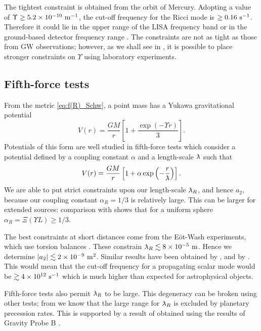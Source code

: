 The tightest constraint is obtained from the orbit of Mercury. Adopting a value of $\Upsilon \geq 5.2 \times 10^{-10}~\mathrm{m^{-1}}$, the cut-off frequency for the Ricci mode is $\geq 0.16~\mathrm{s^{-1}}$. Therefore it could lie in the upper range of the LISA frequency band \citep{Bender1998,Danzmann2003} or in the ground-based detector frequency range \citep{Abramovici1992, Abbott2009, Accadia2010}. The constraints are not as tight as those from GW observations; however, as we shall see in , it is possible to place stronger constraints on $\Upsilon$ using laboratory experiments.

\subsection{Fifth-force tests}\label{sec:Fifth}

From the metric \eqref{eq:f(R)_Schw}, a point mass has a Yukawa gravitational potential \citep{Stelle1978, Capozziello2009a, Naf2010}
\begin{equation}
V(r) = \dfrac{GM}{r}\left[1 + \dfrac{\exp(- \Upsilon r)}{3}\right].
\end{equation}
Potentials of this form are well studied in fifth-force tests \citep{Will2006, Adelberger2009, Adelberger2003} which consider a potential defined by a coupling constant $\alpha$ and a length-scale $\lambdabar$ such that
\begin{equation}
V(r) = \dfrac{GM}{r}\left[1 + \alpha\exp\left(-\dfrac{r}{\lambdabar}\right)\right].
\end{equation}
We are able to put strict constraints upon our length-scale $\lambdabar_R$, and hence $a_2$, because our coupling constant $\alpha_R = 1/3$ is relatively large. This can be larger for extended sources: comparison with  shows that for a uniform sphere $\alpha_R = \Xi(\Upsilon L) \geq 1/3$.

The best constraints at short distances come from the E\"{o}t-Wash experiments, which use torsion balances \citep{Kapner2007a, Hoyle2004}. These constrain $\lambdabar_R \lesssim 8\times 10^{-5}\units{m}$. Hence we determine $|a_2| \lesssim 2 \times 10^{-9}~\mathrm{m^2}$. Similar results have been obtained by \citet{Cembranos2009}, and by \citet{Naf2010}. This would mean that the cut-off frequency for a propagating scalar mode would be $\gtrsim 4 \times 10^{12}~\mathrm{s^{-1}}$ which is much higher than expected for astrophysical objects.

Fifth-force tests also permit $\lambdabar_R$ to be large. This degeneracy can be broken using other tests; from  we know that the large range for $\lambdabar_R$ is excluded by planetary precession rates. This is supported by a result of \citet{Naf2010} obtained using the results of Gravity Probe B \citep{Everitt2009,Everitt2011}.

